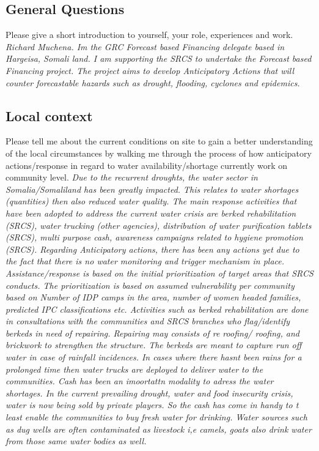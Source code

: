 \subsection*{General Questions}
Please give a short introduction to yourself, your role, experiences and work.
\textit{Richard Muchena. Im the GRC Forecast based Financing delegate based in Hargeisa, Somali land. I am supporting the SRCS to undertake the Forecast based Financing project. The project aims to develop Anticipatory Actions that will counter forecastable hazards such as drought, flooding, cyclones and epidemics.}

\subsection*{Local context}
Please tell me about the current conditions on site to gain a better understanding of the local circumstances by walking me through the process of how anticipatory actions/response in regard to water availability/shortage currently work on community level.\newline
\textit{Due to the recurrent droughts, the water sector in Somalia/Somaliland has been greatly impacted. This relates to water shortages (quantities) then also reduced water quality. The main response activities that have been adopted to address the current water crisis are berked rehabilitation (SRCS), water trucking (other agencies), distribution of water purification tablets (SRCS), multi purpose cash, awareness campaigns related to hygiene promotion (SRCS). Regarding Anticipatory actions, there has been any actions yet due to the fact that there is no water monitoring and trigger mechanism in place. Assistance/response is based on the initial prioritization of target areas that SRCS conducts. The prioritization is based on assumed vulnerability per community based on Number of IDP camps in the area, number of women headed families, predicted IPC classifications etc. Activities such as berked rehabilitation are done in consultations with the communities and SRCS branches who flag/identify berkeds in need of repairing. Repairing may consists of re roofing/ roofing, and brickwork to strengthen the structure. The berkeds are meant to capture run off water in case of rainfall incidences. In cases where there hasnt been rains for a prolonged time then water trucks are deployed to deliver water to the communities. Cash has been an imoortattn modality to adress the water shortages. In the current prevailing drought, water and food insecurity crisis, water is now being sold by private players. So the cash has come in handy to t least enable the communities to buy fresh water for drinking. Water sources such as dug wells are often contaminated as livestock i,e camels, goats also drink water from those same water bodies as well.}

